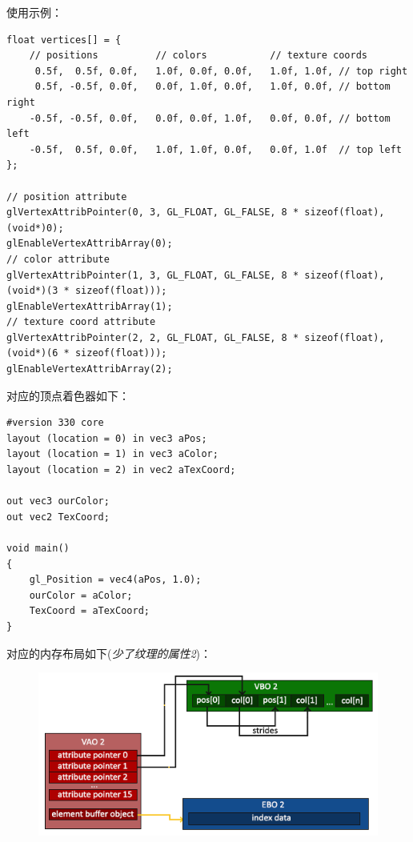 \documentclass[UTF8,a4paper,12pt]{ctexbook}
\begin{document}
					
					使用示例：
					\begin{lstlisting}
float vertices[] = {
    // positions          // colors           // texture coords
     0.5f,  0.5f, 0.0f,   1.0f, 0.0f, 0.0f,   1.0f, 1.0f, // top right
     0.5f, -0.5f, 0.0f,   0.0f, 1.0f, 0.0f,   1.0f, 0.0f, // bottom right
    -0.5f, -0.5f, 0.0f,   0.0f, 0.0f, 1.0f,   0.0f, 0.0f, // bottom left
    -0.5f,  0.5f, 0.0f,   1.0f, 1.0f, 0.0f,   0.0f, 1.0f  // top left 
};
 
// position attribute
glVertexAttribPointer(0, 3, GL_FLOAT, GL_FALSE, 8 * sizeof(float), (void*)0);
glEnableVertexAttribArray(0);
// color attribute
glVertexAttribPointer(1, 3, GL_FLOAT, GL_FALSE, 8 * sizeof(float), (void*)(3 * sizeof(float)));
glEnableVertexAttribArray(1);
// texture coord attribute
glVertexAttribPointer(2, 2, GL_FLOAT, GL_FALSE, 8 * sizeof(float), (void*)(6 * sizeof(float)));
glEnableVertexAttribArray(2);   	
					\end{lstlisting}
					
					
					对应的顶点着色器如下：
					\begin{lstlisting}
#version 330 core
layout (location = 0) in vec3 aPos;
layout (location = 1) in vec3 aColor;
layout (location = 2) in vec2 aTexCoord;

out vec3 ourColor;
out vec2 TexCoord;

void main()
{
    gl_Position = vec4(aPos, 1.0);
    ourColor = aColor;
    TexCoord = aTexCoord;
}					
					\end{lstlisting}
					
					对应的内存布局如下(\textit{少了纹理的属性2})：
					
					\begin{figure}[H]
						\centering
						\includegraphics[width=.9\linewidth]{vertexAttribute}
					\end{figure}
					
					
					
					
					
\end{document}

